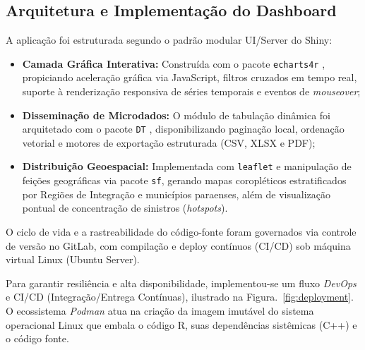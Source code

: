 \documentclass[sigconf, nonacm, screen, language=portuguese, language=spanish, language={main=english}]{acmart}
\begin{document}
\subsection{Arquitetura e Implementação do Dashboard}
A aplicação foi estruturada segundo o padrão modular UI/Server do Shiny:
\begin{itemize}
    \item \textbf{Camada Gráfica Interativa:} Construída com o pacote \texttt{echarts4r} \cite{echarts4r2023}, propiciando aceleração gráfica via JavaScript, filtros cruzados em tempo real, suporte à renderização responsiva de séries temporais e eventos de \textit{mouseover};
    \item \textbf{Disseminação de Microdados:} O módulo de tabulação dinâmica foi arquitetado com o pacote \texttt{DT} \cite{dt2024}, disponibilizando paginação local, ordenação vetorial e motores de exportação estruturada (CSV, XLSX e PDF);
    \item \textbf{Distribuição Geoespacial:} Implementada com \texttt{leaflet} \cite{leaflet2024} e manipulação de feições geográficas via pacote \texttt{sf}, gerando mapas coropléticos estratificados por Regiões de Integração e municípios paraenses, além de visualização pontual de concentração de sinistros (\textit{hotspots}).
\end{itemize}

O ciclo de vida e a rastreabilidade do código-fonte foram governados via controle de versão no GitLab, com compilação e deploy contínuos (CI/CD) sob máquina virtual Linux (Ubuntu Server).



Para garantir resiliência e alta disponibilidade, implementou-se um fluxo \textit{DevOps} e CI/CD (Integração/Entrega Contínuas), ilustrado na Figura.~\ref{fig:deployment}. O ecossistema \textit{Podman} \cite{podman2026} atua na criação da imagem imutável do sistema operacional Linux que embala o código R, suas dependências sistêmicas (C++) e o código fonte. 
\end{document}
